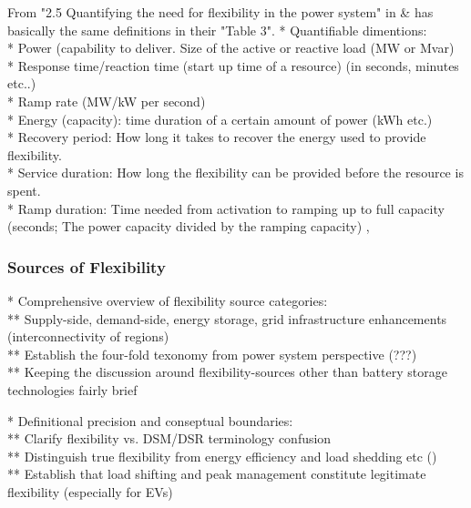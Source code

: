 From "2.5 Quantifying the need for flexibility in the power system" in \cite{emil_hillberg_flexibility_2019} \& \cite{degefa_comprehensive_2021} has basically the same definitions in their "Table 3".
* Quantifiable dimentions: \\
* Power (capability to deliver. Size of the active or reactive load (MW or Mvar) \\
* Response time/reaction time (start up time of a resource) (in seconds, minutes etc..) \\
* Ramp rate (MW/kW per second) \\
* Energy (capacity): time duration of a certain amount of power (kWh etc.) \\
* Recovery period: How long it takes to recover the energy used to provide flexibility. \\
* Service duration: How long the flexibility can be provided before the resource is spent. \\
* Ramp duration: Time needed from activation to ramping up to full capacity (seconds; The power capacity divided by the ramping capacity)
\cite{emil_hillberg_flexibility_2019}, \cite{degefa_comprehensive_2021} \\



\subsubsection{Sources of Flexibility}

* Comprehensive overview of flexibility source categories: \\
** Supply-side, demand-side, energy storage, grid infrastructure enhancements (interconnectivity of regions) \\
** Establish the four-fold texonomy from power system perspective (???) \\
** Keeping the discussion around flexibility-sources other than battery storage technologies fairly brief

* Definitional precision and conseptual boundaries: \\
** Clarify flexibility vs. DSM/DSR terminology confusion \\
** Distinguish true flexibility from energy efficiency and load shedding etc (\cite{degefa_comprehensive_2021}) \\
** Establish that load shifting and peak management constitute legitimate flexibility (especially for EVs) \\

